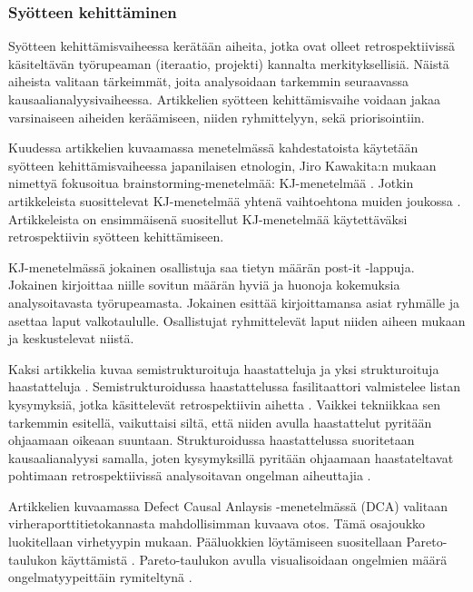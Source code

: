 \subsubsection{Syötteen kehittäminen}
Syötteen kehittämisvaiheessa kerätään aiheita, jotka ovat olleet retrospektiivissä käsiteltävän työrupeaman (iteraatio, projekti) kannalta merkityksellisiä. Näistä aiheista valitaan tärkeimmät, joita analysoidaan tarkemmin seuraavassa kausaalianalyysivaiheessa. Artikkelien syötteen kehittämisvaihe voidaan jakaa varsinaiseen aiheiden keräämiseen, niiden ryhmittelyyn, sekä priorisointiin.

Kuudessa artikkelien kuvaamassa menetelmässä \citep{birk2002postmortem, dingsoyr2003extending, staalhane2003post, de2004learning, Bjornson2009} kahdestatoista käytetään syötteen kehittämisvaiheessa japanilaisen etnologin, Jiro Kawakita:n mukaan nimettyä fokusoitua brainstorming-menetelmää: KJ-menetelmää \citep{dingsoyr2003extending}. Jotkin artikkeleista suosittelevat KJ-menetelmää yhtenä vaihtoehtona muiden joukossa \citep{birk2002postmortem, staalhane2003post, de2004learning}. Artikkeleista \citep{birk2002postmortem} on ensimmäisenä suositellut KJ-menetelmää käytettäväksi retrospektiivin syötteen kehittämiseen.

KJ-menetelmässä jokainen osallistuja saa tietyn määrän post-it -lappuja. Jokainen kirjoittaa niille sovitun määrän hyviä ja huonoja kokemuksia analysoitavasta työrupeamasta. Jokainen esittää kirjoittamansa asiat ryhmälle ja asettaa laput valkotaululle. Osallistujat ryhmittelevät laput niiden aiheen mukaan ja keskustelevat niistä. \citep{birk2002postmortem}

Kaksi artikkelia kuvaa semistrukturoituja haastatteluja \citep{birk2002postmortem, de2004learning} ja yksi strukturoituja haastatteluja \citep{staalhane2003post}. Semistrukturoidussa haastattelussa fasilitaattori valmistelee listan kysymyksiä, jotka käsittelevät retrospektiivin aihetta \citep{birk2002postmortem}. Vaikkei tekniikkaa sen tarkemmin esitellä, vaikuttaisi siltä, että niiden avulla haastattelut pyritään ohjaamaan oikeaan suuntaan. Strukturoidussa haastattelussa suoritetaan kausaalianalyysi samalla, joten kysymyksillä pyritään ohjaamaan haastateltavat pohtimaan retrospektiivissä analysoitavan ongelman aiheuttajia \citep{staalhane2003post}.

Artikkelien \citep{kalinowski2012evidence, card1998learning} kuvaamassa Defect Causal Anlaysis -menetelmässä (DCA) valitaan virheraporttitietokannasta mahdollisimman kuvaava otos. Tämä osajoukko luokitellaan virhetyypin mukaan. Pääluokkien löytämiseen suositellaan Pareto-taulukon käyttämistä \citep{kalinowski2012evidence, card1998learning}. Pareto-taulukon avulla visualisoidaan ongelmien määrä ongelmatyypeittäin rymiteltynä \citep{card1998learning}.


